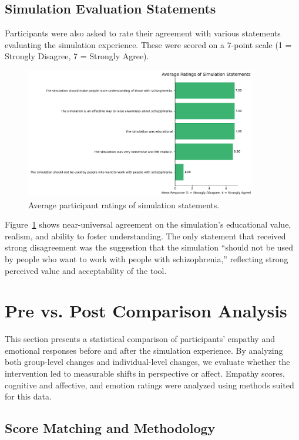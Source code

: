\subsection{Simulation Evaluation Statements}

Participants were also asked to rate their agreement with various statements evaluating the simulation experience. These were scored on a 7-point scale (1 = Strongly Disagree, 7 = Strongly Agree).

\begin{figure}[H]
    \centering
    \includegraphics[width=0.9\textwidth]{../../Figures/simulation-evaluation-post.png}
    \caption{Average participant ratings of simulation statements.}
    \label{fig:simulation_evaluation_post}
\end{figure}

Figure~\ref{fig:simulation_evaluation_post} shows near-universal agreement on the simulation’s educational value, realism, and ability to foster understanding. The only statement that received strong disagreement was the suggestion that the simulation “should not be used by people who want to work with people with schizophrenia,” reflecting strong perceived value and acceptability of the tool.

\section{Pre vs. Post Comparison Analysis}
This section presents a statistical comparison of participants’ empathy and emotional responses before and after the simulation experience. By analyzing both group-level changes and individual-level changes, we evaluate whether the intervention led to measurable shifts in perspective or affect. Empathy scores, cognitive and affective, and emotion ratings were analyzed using methods suited for this data.

\subsection{Score Matching and Methodology}

